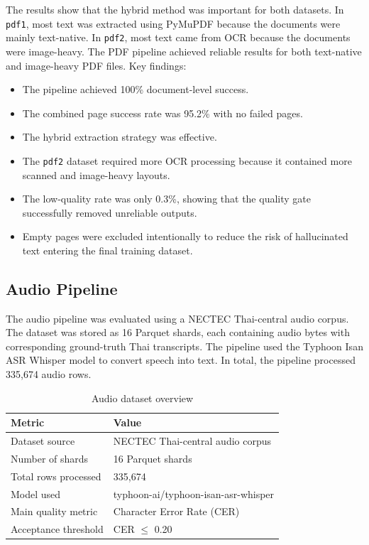 \documentclass[12pt,oneside,openright,a4paper]{cpe-english-project}
\begin{document}
The results show that the hybrid method was important for both datasets. In \texttt{pdf1}, most text was extracted using PyMuPDF because the documents were mainly text-native. In \texttt{pdf2}, most text came from OCR because the documents were image-heavy. The PDF pipeline achieved reliable results for both text-native and image-heavy PDF files. Key findings:
\begin{itemize}
\item The pipeline achieved 100\% document-level success.
\item The combined page success rate was 95.2\% with no failed pages.
\item The hybrid extraction strategy was effective.
\item The \texttt{pdf2} dataset required more OCR processing because it contained more scanned and image-heavy layouts.
\item The low-quality rate was only 0.3\%, showing that the quality gate successfully removed unreliable outputs.
\item Empty pages were excluded intentionally to reduce the risk of hallucinated text entering the final training dataset.
\end{itemize}
\newpage
\subsection{Audio Pipeline}

The audio pipeline was evaluated using a NECTEC Thai-central audio corpus. The dataset was stored as 16 Parquet shards, each containing audio bytes with corresponding ground-truth Thai transcripts. The pipeline used the Typhoon Isan ASR Whisper model to convert speech into text. In total, the pipeline processed 335{,}674 audio rows.

\begin{table}[H]
\centering
\caption{Audio dataset overview}\label{tbl:audio-overview}
\begin{tabular}{|p{}|p{}|}
\hline
\textbf{Metric} & \textbf{Value} \\ \hline
Dataset source & NECTEC Thai-central audio corpus \\ \hline
Number of shards & 16 Parquet shards \\ \hline
Total rows processed & 335{,}674 \\ \hline
Model used & typhoon-ai/typhoon-isan-asr-whisper \\ \hline
Main quality metric & Character Error Rate (CER) \\ \hline
Acceptance threshold & CER $\leq$ 0.20 \\ \hline
\end{tabular}
\end{table}
\end{document}
